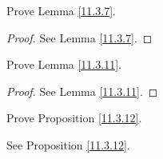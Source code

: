 \begin{exercise}\label{ex 11.3.3}
    Prove Lemma \ref{11.3.7}.
\end{exercise}

\begin{proof}
    See Lemma \ref{11.3.7}.
\end{proof}

\begin{exercise}\label{ex 11.3.4}
    Prove Lemma \ref{11.3.11}.
\end{exercise}

\begin{proof}
    See Lemma \ref{11.3.11}.
\end{proof}

\begin{exercise}\label{ex 11.3.5}
    Prove Proposition \ref{11.3.12}.
\end{exercise}

\begin{proposition}
    See Proposition \ref{11.3.12}.
\end{proposition}